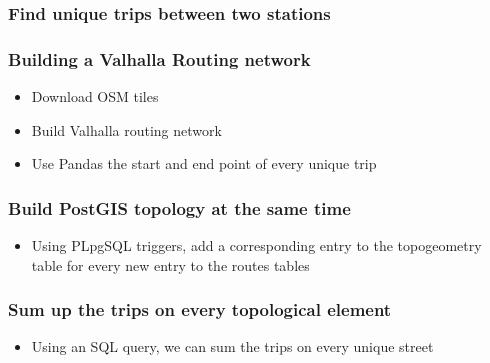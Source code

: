 \documentclass{beamer}
\begin{document}
\begin{frame}
    \frametitle{Find unique trips between two stations}

\end{frame}

\begin{frame}
    \frametitle{Building a Valhalla Routing network}

    \begin{itemize}
        \item Download OSM tiles
        \item Build Valhalla routing network
        \item Use Pandas the start and end point of every unique trip
    \end{itemize}
\end{frame}

\begin{frame}
    \frametitle{Build PostGIS topology at the same time}
    \begin{itemize}
        \item Using PLpgSQL triggers, add a corresponding entry to the topogeometry table for every new entry to the routes tables
    \end{itemize}
\end{frame}

\begin{frame}
    \frametitle{Sum up the trips on every topological element}

    
\begin{itemize}
    \item Using an SQL query, we can sum the trips on every unique street 
\end{itemize}

\end{frame}
\end{document}
